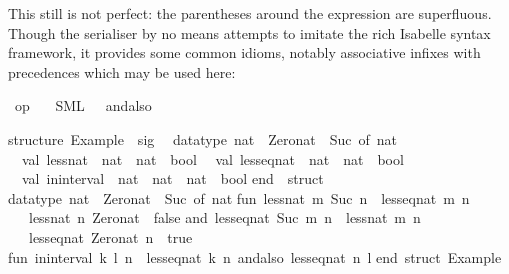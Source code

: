 \begin{isabellebody}
\begin{isamarkuptext}
\begin{typewriter}
  \end{typewriter}%
\end{isamarkuptext}%
\isamarkuptrue%
%
\endisatagquote
{\isafoldquote}%
%
\isadelimquote
%
\endisadelimquote
%
\begin{isamarkuptext}%
\noindent This still is not perfect: the parentheses around the
   expression are superfluous.  Though the serialiser by
  no means attempts to imitate the rich Isabelle syntax framework, it
  provides some common idioms, notably associative infixes with
  precedences which may be used here:%
\end{isamarkuptext}%
\isamarkuptrue%
%
\isadelimquotett
%
\endisadelimquotett
%
\isatagquotett
{}\isamarkupfalse%
\ {\isachardoublequoteopen}op\ {\isasymand}{\isachardoublequoteclose}\isanewline
\ \ {\isacharparenleft}SML\ \ {}\ {\isachardoublequoteopen}andalso{\isachardoublequoteclose}{\isacharparenright}%
\endisatagquotett
{\isafoldquotett}%
%
\isadelimquotett
%
\endisadelimquotett
%
\isadelimquote
%
\endisadelimquote
%
\isatagquote
%
\begin{isamarkuptext}%
\begin{typewriter}
    structure\ Example\ {\isacharcolon}\ sig\isanewline
\ \ datatype\ nat\ {\isacharequal}\ Zero{\isacharunderscore}nat\ {\isacharbar}\ Suc\ of\ nat\isanewline
\ \ val\ less{\isacharunderscore}nat\ {\isacharcolon}\ nat\ {\isacharminus}{\isachargreater}\ nat\ {\isacharminus}{\isachargreater}\ bool\isanewline
\ \ val\ less{\isacharunderscore}eq{\isacharunderscore}nat\ {\isacharcolon}\ nat\ {\isacharminus}{\isachargreater}\ nat\ {\isacharminus}{\isachargreater}\ bool\isanewline
\ \ val\ in{\isacharunderscore}interval\ {\isacharcolon}\ nat\ {\isacharasterisk}\ nat\ {\isacharminus}{\isachargreater}\ nat\ {\isacharminus}{\isachargreater}\ bool\isanewline
end\ {\isacharequal}\ struct\isanewline
\isanewline
datatype\ nat\ {\isacharequal}\ Zero{\isacharunderscore}nat\ {\isacharbar}\ Suc\ of\ nat{\isacharsemicolon}\isanewline
\isanewline
fun\ less{\isacharunderscore}nat\ m\ {\isacharparenleft}Suc\ n{\isacharparenright}\ {\isacharequal}\ less{\isacharunderscore}eq{\isacharunderscore}nat\ m\ n\isanewline
\ \ {\isacharbar}\ less{\isacharunderscore}nat\ n\ Zero{\isacharunderscore}nat\ {\isacharequal}\ false\isanewline
and\ less{\isacharunderscore}eq{\isacharunderscore}nat\ {\isacharparenleft}Suc\ m{\isacharparenright}\ n\ {\isacharequal}\ less{\isacharunderscore}nat\ m\ n\isanewline
\ \ {\isacharbar}\ less{\isacharunderscore}eq{\isacharunderscore}nat\ Zero{\isacharunderscore}nat\ n\ {\isacharequal}\ true{\isacharsemicolon}\isanewline
\isanewline
fun\ in{\isacharunderscore}interval\ {\isacharparenleft}k{\isacharcomma}\ l{\isacharparenright}\ n\ {\isacharequal}\ less{\isacharunderscore}eq{\isacharunderscore}nat\ k\ n\ andalso\ less{\isacharunderscore}eq{\isacharunderscore}nat\ n\ l{\isacharsemicolon}\isanewline
\isanewline
end{\isacharsemicolon}\ {\isacharparenleft}{\isacharasterisk}struct\ Example{\isacharasterisk}{\isacharparenright}\isanewline


\end{typewriter}
\end{isamarkuptext}
\end{isabellebody}
